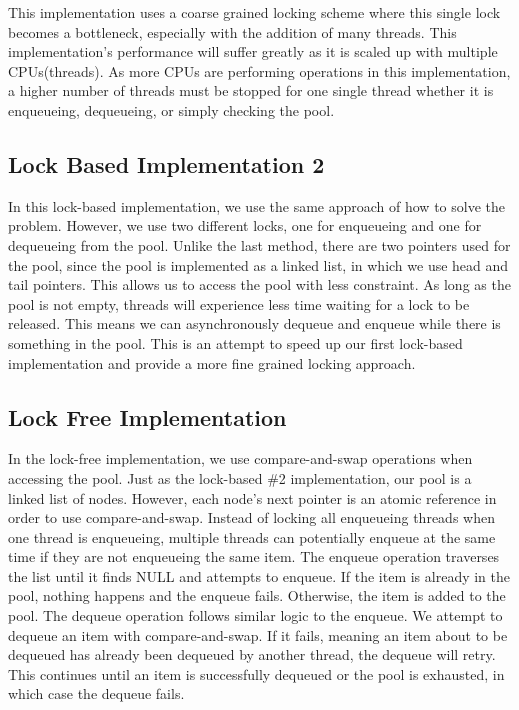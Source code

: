 \documentclass[letterpaper, 10 pt, conference]{IEEEconf}
\begin{document}
This implementation uses a coarse grained locking scheme where this single lock becomes a bottleneck, especially with the addition of many threads. This implementation's performance will suffer greatly as it is scaled up with multiple CPUs(threads). As more CPUs are performing operations in this implementation, a higher number of threads must be stopped for one single thread whether it is enqueueing, dequeueing, or simply checking the pool. 
\subsection{Lock Based Implementation 2}
In this lock-based implementation, we use the same approach of how to solve the problem. However, we use two different locks, one for enqueueing and one for dequeueing from the pool. Unlike the last method, there are two pointers used for the pool, since the pool is implemented as a linked list, in which we use head and tail pointers. This allows us to access the pool with less constraint. As long as the pool is not empty, threads will experience less time waiting for a lock to be released. This means we can asynchronously dequeue and enqueue while there is something in the pool. 
This is an attempt to speed up our first lock-based implementation and provide a more fine grained locking approach. 

\subsection{Lock Free Implementation}
In the lock-free implementation, we use compare-and-swap operations when accessing the pool. Just as the lock-based \#2 implementation, our pool is a linked list of nodes. However, each node's next pointer is an atomic reference in order to use compare-and-swap. Instead of locking all enqueueing threads when one thread is enqueueing, multiple threads can potentially enqueue at the same time if they are not enqueueing the same item. The enqueue operation traverses the list until it finds NULL and attempts to enqueue. If the item is already in the pool, nothing happens and the enqueue fails. Otherwise, the item is added to the pool. The dequeue operation follows similar logic to the enqueue. We attempt to dequeue an item with compare-and-swap. If it fails, meaning an item about to be dequeued has already been dequeued by another thread, the dequeue will retry. This continues until an item is successfully dequeued or the pool is exhausted, in which case the dequeue fails. 
\end{document}

